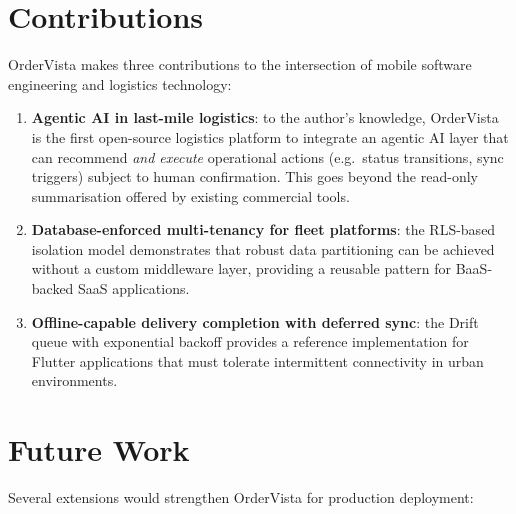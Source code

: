\section{Contributions}
\label{sec:conc-contributions}

OrderVista makes three contributions to the intersection of mobile
software engineering and logistics technology:

\begin{enumerate}
  \item \textbf{Agentic AI in last-mile logistics}: to the author's
        knowledge, OrderVista is the first open-source logistics
        platform to integrate an agentic AI layer that can recommend
        \emph{and execute} operational actions (e.g.\ status transitions,
        sync triggers) subject to human confirmation.  This goes beyond
        the read-only summarisation offered by existing commercial tools.
  \item \textbf{Database-enforced multi-tenancy for fleet platforms}: the RLS-based isolation model demonstrates that robust data
        partitioning can be achieved without a custom middleware layer,
        providing a reusable pattern for BaaS-backed SaaS applications.
  \item \textbf{Offline-capable delivery completion with deferred sync}: the Drift queue with exponential backoff provides a reference
        implementation for Flutter applications that must tolerate
        intermittent connectivity in urban environments.
\end{enumerate}

\section{Future Work}
\label{sec:future-work}

Several extensions would strengthen OrderVista for production deployment:

